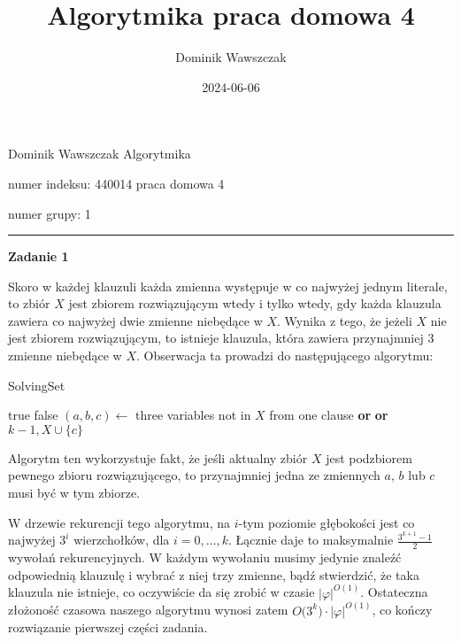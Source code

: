 \documentclass[12pt]{article}
\title{Algorytmika praca domowa 4}
\author{Dominik Wawszczak}
\date{2024-06-06}
\begin{document}
	\setlength{\parindent}{0 cm}
	
	Dominik Wawszczak \hfill Algorytmika
	
	numer indeksu: 440014 \hfill praca domowa 4
	
	numer grupy: 1
	
	\bigskip
	\hrule
	\bigskip
	
	\textbf{Zadanie 1}
	
	\medskip
	
	Skoro w każdej klauzuli każda zmienna występuje w co najwyżej jednym
	literale, to zbiór \(X\) jest zbiorem rozwiązującym wtedy i tylko wtedy, gdy
	każda klauzula zawiera co najwyżej dwie zmienne niebędące w \(X\). Wynika z
	tego, że jeżeli \(X\) nie jest zbiorem rozwiązującym, to istnieje klauzula,
	która zawiera przynajmniej \(3\) zmienne niebędące w \(X\). Obserwacja ta
	prowadzi do następującego algorytmu:
	
	\begin{algorithm}
		\caption{SolvingSet}
		\begin{algorithmic}[1]
			        \State \Return true
			    \EndIf
			        \State \Return false
			    \EndIf
			    \State $(a, b, c) \gets$ three variables not in $X$ from one
			    clause
			    \State \Return {}
			    \textbf{or}  \textbf{or}
			    \Statex \hspace{4.685em} 
			                                  {$k - 1, X \cup \{c\}$}
			\EndProcedure
		\end{algorithmic}
	\end{algorithm}
	
	Algorytm ten wykorzystuje fakt, że jeśli aktualny zbiór \(X\) jest
	podzbiorem pewnego zbioru rozwiązującego, to przynajmniej jedna ze zmiennych
	\(a\), \(b\) lub \(c\) musi być w tym zbiorze.
	
	\medskip
	
	W drzewie rekurencji tego algorytmu, na \(i\)-tym poziomie głębokości jest
	co najwyżej \(3^{i}\) wierzchołków, dla \(i = 0, \ldots, k\). Łącznie daje
	to maksymalnie \(\frac{3^{k + 1} - 1}{2}\) wywołań rekurencyjnych. W każdym
	wywołaniu musimy jedynie znaleźć odpowiednią klauzulę i wybrać z niej trzy
	zmienne, bądź stwierdzić, że taka klauzula nie istnieje, co oczywiście da
	się zrobić w czasie \(|\varphi|^{O(1)}\). Ostateczna złożoność czasowa
	naszego algorytmu wynosi zatem \(O\big(3^{k}\big) \cdot |\varphi|^{O(1)}\),
	co kończy rozwiązanie pierwszej części zadania.
	
\end{document}
